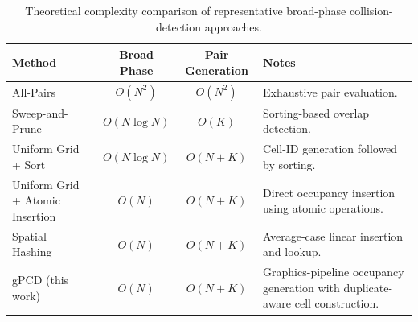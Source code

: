 \begin{table}[t]
\centering
\footnotesize
\caption{Theoretical complexity comparison of representative broad-phase collision-detection approaches.}
\label{tab:complexity_comparison}

\begin{tabular}{l c c p{2.2in}}
\toprule
Method & Broad Phase & Pair Generation & Notes \\
\midrule

All-Pairs
&
$O(N^2)$
&
$O(N^2)$
&
Exhaustive pair evaluation.
\\

Sweep-and-Prune~\cite{capannini}
&
$O(N\log N)$
&
$O(K)$
&
Sorting-based overlap detection.
\\

Uniform Grid + Sort~\cite{legrand}
&
$O(N\log N)$
&
$O(N+K)$
&
Cell-ID generation followed by sorting.
\\

Uniform Grid + Atomic Insertion~\cite{barbieri2013}
&
$O(N)$
&
$O(N+K)$
&
Direct occupancy insertion using atomic operations.
\\

Spatial Hashing~\cite{hastings}
&
$O(N)$
&
$O(N+K)$
&
Average-case linear insertion and lookup.
\\

gPCD (this work)
&
$O(N)$
&
$O(N+K)$
&
Graphics-pipeline occupancy generation with duplicate-aware cell construction.
\\

\bottomrule
\end{tabular}
\end{table}